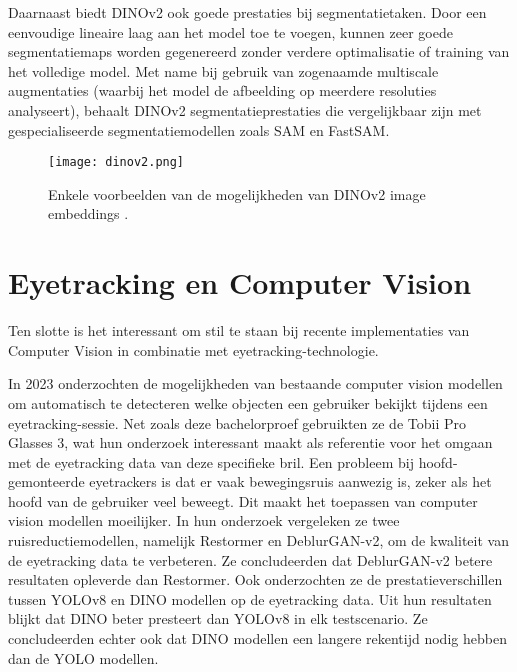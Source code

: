 Daarnaast biedt DINOv2 ook goede prestaties bij segmentatietaken. Door een eenvoudige lineaire laag aan het model toe te voegen, kunnen zeer goede segmentatiemaps worden gegenereerd zonder verdere optimalisatie of training van het volledige model. 
Met name bij gebruik van zogenaamde multiscale augmentaties (waarbij het model de afbeelding op meerdere resoluties analyseert), 
behaalt DINOv2 segmentatieprestaties die vergelijkbaar zijn met gespecialiseerde segmentatiemodellen zoals SAM en FastSAM.

\begin{figure}[H]
  \centering
  \texttt{[image: dinov2.png]}
  \caption[]{\label{fig:dinov2}Enkele voorbeelden van de mogelijkheden van DINOv2 image embeddings \autocite{Oquab2024}.}
\end{figure}

\section{Eyetracking en Computer Vision}

Ten slotte is het interessant om stil te staan bij recente implementaties van Computer Vision in combinatie met eyetracking-technologie.

In 2023 onderzochten \textcite{Cederin2023} de mogelijkheden van bestaande computer vision modellen om automatisch te detecteren welke objecten een gebruiker bekijkt tijdens een eyetracking-sessie.
Net zoals deze bachelorproef gebruikten ze de Tobii Pro Glasses 3, wat hun onderzoek interessant maakt als referentie voor het omgaan met de eyetracking data van deze specifieke bril.
Een probleem bij hoofd-gemonteerde eyetrackers is dat er vaak bewegingsruis aanwezig is, zeker als het hoofd van de gebruiker veel beweegt. Dit maakt het toepassen van computer vision modellen moeilijker.
In hun onderzoek vergeleken ze twee ruisreductiemodellen, namelijk Restormer en DeblurGAN-v2, om de kwaliteit van de eyetracking data te verbeteren. Ze concludeerden dat DeblurGAN-v2 betere resultaten opleverde dan Restormer.
Ook onderzochten ze de prestatieverschillen tussen YOLOv8 en DINO modellen op de eyetracking data. Uit hun resultaten blijkt dat DINO beter presteert dan YOLOv8 in elk testscenario. Ze concludeerden echter ook dat 
DINO modellen een langere rekentijd nodig hebben dan de YOLO modellen.

